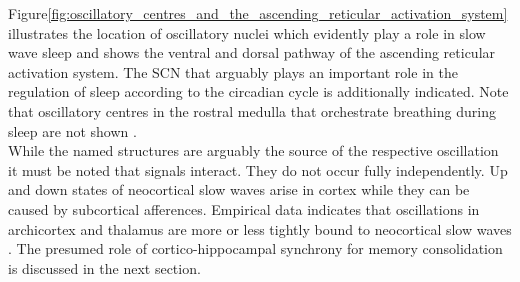 Figure\ref{fig:oscillatory_centres_and_the_ascending_reticular_activation_system} illustrates the location of oscillatory nuclei which evidently play a role in slow wave sleep and shows the ventral and dorsal pathway of the ascending reticular activation system. The SCN that arguably plays an important role in the regulation of sleep according to the circadian cycle is additionally indicated. Note that oscillatory centres in the rostral medulla that orchestrate breathing during sleep are not shown \parencite{kubin2019interactions}.\\
While the named structures are arguably the source of the respective oscillation it must be noted that signals interact. They do not occur fully independently. Up and down states of neocortical slow waves arise in cortex while they can be caused by subcortical afferences. Empirical data indicates that oscillations in archicortex and thalamus are more or less tightly bound to neocortical slow waves \parencite{niethard2018cortical}. The presumed role of cortico-hippocampal synchrony for memory consolidation is discussed in the next section.\\
